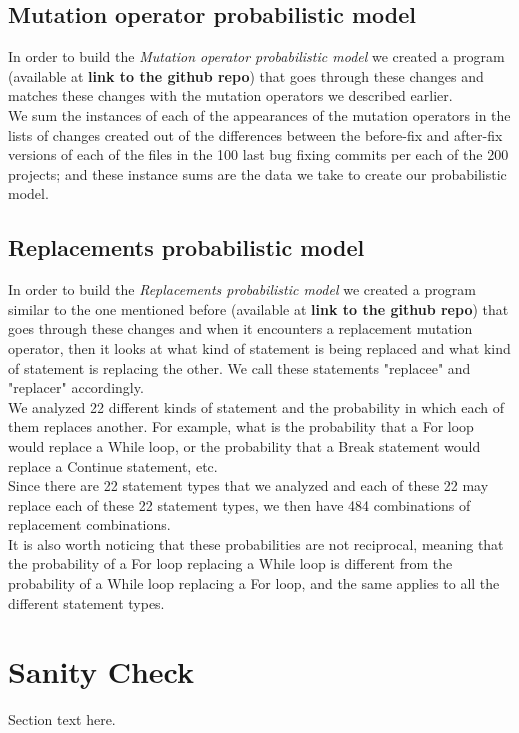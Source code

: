\documentclass[conference]{IEEEtran}
\newcommand{\todo}[1]
  {{\scriptsize \textbf{\color{red} {#1}}}}
\begin{document}
{{\subsection{Mutation operator probabilistic model}
In order to build the \textit{Mutation operator probabilistic model} we created a program (available at \todo{link to the github repo}) that goes through these changes and matches these changes with the mutation operators we described earlier.\\
We sum the instances of each of the appearances of the mutation operators in the lists of changes created out of the differences between the before-fix and after-fix versions of each of the files in the 100 last bug fixing commits per each of the 200 projects; and these instance sums are the data we take to create our probabilistic model.\\  


\subsection{Replacements probabilistic model}
In order to build the \textit{Replacements probabilistic model} we created a program similar to the one mentioned before (available at \todo{link to the github repo}) that goes through these changes and when it encounters a replacement mutation operator, then it looks at what kind of statement is being replaced and what kind of statement is replacing the other. We call these statements "replacee" and "replacer" accordingly.\\
We analyzed 22 different kinds of statement and the probability in which each of them replaces another. For example, what is the probability that a For loop would replace a While loop, or the probability that a Break statement would replace a Continue statement, etc.\\
Since there are 22 statement types that we analyzed and each of these 22 may replace each of these 22 statement types, we then have 484 combinations of replacement combinations. \\
It is also worth noticing that these probabilities are not reciprocal, meaning that the probability of a For loop replacing a While loop is different from the probability of a While loop replacing a For loop, and the same applies to all the different statement types.\\

\section{Sanity Check}
Section text here.

}}
\end{document}
